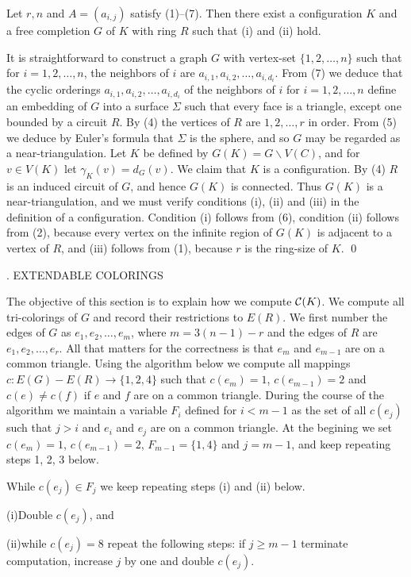 Let $r,n$ and $A=(a_{i,j})$ satisfy (1)--(7). Then there
exist a configuration $K$ and a free completion $G$ of $K$ with
ring $R$ such that (i) and (ii) hold.

\proof It is straightforward to construct a graph $G$ with
vertex-set $\{1,2,\ldots,n\}$ such that for $i=1,2,\ldots,n$,
the neighbors of $i$ are $a_{i,1},a_{i,2},\ldots,a_{i,d_i}$.
From (7) we deduce that the cyclic orderings 
$a_{i,1},a_{i,2},\ldots,a_{i,d_i}$ of the neighbors of $i$
for $i=1,2,\ldots,n$ define an embedding of $G$ into a surface
$\Sigma$ such that every face is a triangle, except one bounded
by a circuit $R$. By (4) the vertices of $R$ are $1,2,\ldots,r$
in order. From (5) we deduce by Euler's formula that $\Sigma$
is the sphere, and so $G$ may be regarded as a near-triangulation.
Let $K$ be defined by 
$G(K)=G\backslash V(C)$, and for $v\in V(K)$ let $\gamma_K(v)=
d_G(v)$. We claim that $K$ is a configuration. By (4)
$R$ is an induced circuit of $G$, and hence $G(K)$ is connected.
Thus $G(K)$ is a near-triangulation, and we must verify conditions
(i), (ii) and (iii) in the definition of a configuration. Condition
(i) follows from (6), condition (ii) follows from (2), because
every vertex on the infinite region of $G(K)$ is adjacent to a vertex
of $R$, and (iii) follows from (1), because $r$ is the ring-size
of $K$. \qed

. EXTENDABLE COLORINGS

The objective of this section is to explain how we compute ${\cal C}(K)$.
We compute all tri-colorings of $G$ and record their restrictions
to $E(R)$. We first number the edges of $G$ as $e_1,e_2,\ldots,e_m$,
where $m=3(n-1)-r$ and the edges of $R$ are $e_1,e_2,\ldots,e_r$.
All that matters for the correctness is that $e_m$ and $e_{m-1}$
are on a common triangle. Using the algorithm below we compute 
all mappings $c:E(G)-E(R)\to
\{1,2,4\}$ such that $c(e_m)=1$, $c(e_{m-1})=2$ and
$c(e)\not=c(f)$ if $e$ and $f$ are on a
common triangle. During the course of
the algorithm we maintain a variable $F_i$ defined for $i<m-1$ as the
set of all $c(e_j)$ such that $j>i$ and $e_i$ and $e_j$ are on a common
triangle. At the begining we set $c(e_m)=1$, $c(e_{m-1})=2$,
$F_{m-1}=\{1,4\}$ and $j=m-1$, and keep repeating steps 1, 2,
3 below.

 While $c(e_j)\in F_j$ we keep repeating
steps (i) and (ii) below.
\item{(i)}Double $c(e_j)$, and
\item{(ii)}while $c(e_j)=8$ repeat the following steps:
if $j\ge m-1$ terminate computation,
increase $j$ by one and double $c(e_j)$.

